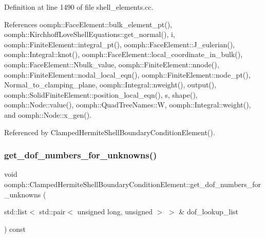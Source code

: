Definition at line 1490 of file shell\+\_\+elements.\+cc.



References oomph\+::\+Face\+Element\+::bulk\+\_\+element\+\_\+pt(), oomph\+::\+Kirchhoff\+Love\+Shell\+Equations\+::get\+\_\+normal(), i, oomph\+::\+Finite\+Element\+::integral\+\_\+pt(), oomph\+::\+Face\+Element\+::\+J\+\_\+eulerian(), oomph\+::\+Integral\+::knot(), oomph\+::\+Face\+Element\+::local\+\_\+coordinate\+\_\+in\+\_\+bulk(), oomph\+::\+Face\+Element\+::\+Nbulk\+\_\+value, oomph\+::\+Finite\+Element\+::nnode(), oomph\+::\+Finite\+Element\+::nodal\+\_\+local\+\_\+eqn(), oomph\+::\+Finite\+Element\+::node\+\_\+pt(), Normal\+\_\+to\+\_\+clamping\+\_\+plane, oomph\+::\+Integral\+::nweight(), output(), oomph\+::\+Solid\+Finite\+Element\+::position\+\_\+local\+\_\+eqn(), s, shape(), oomph\+::\+Node\+::value(), oomph\+::\+Quad\+Tree\+Names\+::W, oomph\+::\+Integral\+::weight(), and oomph\+::\+Node\+::x\+\_\+gen().



Referenced by Clamped\+Hermite\+Shell\+Boundary\+Condition\+Element().

\mbox{\label{classoomph_1_1ClampedHermiteShellBoundaryConditionElement_a7b18a5df8ade2926ccd6e7bcfa182dd9}} 
\subsubsection{\texorpdfstring{get\+\_\+dof\+\_\+numbers\+\_\+for\+\_\+unknowns()}{get\_dof\_numbers\_for\_unknowns()}}
{\footnotesize\ttfamily void oomph\+::\+Clamped\+Hermite\+Shell\+Boundary\+Condition\+Element\+::get\+\_\+dof\+\_\+numbers\+\_\+for\+\_\+unknowns (\begin{DoxyParamCaption}\item[{std\+::list$<$ std\+::pair$<$ unsigned long, unsigned $>$ $>$ \&}]{dof\+\_\+lookup\+\_\+list }\end{DoxyParamCaption}) const\hspace{0.3cm}{\ttfamily [virtual]}}




